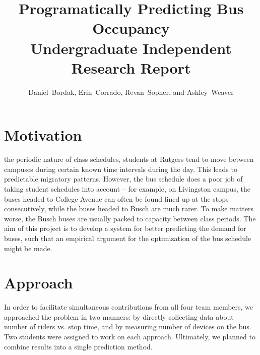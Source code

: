\documentclass[11pt,journal,compsoc]{IEEEtran} %
\begin{document}
\title{Programatically Predicting Bus Occupancy\\
{\large Undergraduate Independent Research Report}}
\author{Daniel~Bordak, Erin~Corrado, Revan~Sopher, and Ashley~Weaver}


\maketitle

\section{Motivation}

the periodic nature of class schedules, students at Rutgers tend to move between campuses during certain known time intervals during the day.
This leads to predictable migratory patterns.
However, the bus schedule does a poor job of taking student schedules into account -- for example, on Livingston campus, the buses headed to College Avenue can often be found lined up at the stops consecutively, while the buses headed to Busch are much rarer.
To make matters worse, the Busch buses are usually packed to capacity between class periods.
The aim of this project is to develop a system for better predicting the demand for buses, such that an empirical argument for the optimization of the bus schedule might be made.

\section{Approach}

In order to facilitate simultaneous contributions from all four team members, we approached the problem in two manners: by directly collecting data about number of riders vs. stop time, and by measuring number of devices on the bus.
Two students were assigned to work on each approach.
Ultimately, we planned to combine results into a single prediction method.
\end{document}
